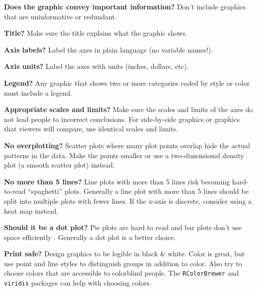 \documentclass{article}
\newcommand{\code}[1]{\texttt{#1}}
\begin{document}
\begin{checklist}
\item \textbf{Does the graphic convey important information?} Don't include
  graphics that are uninformative or redundant.
\item \textbf{Title?} Make sure the title explains what the graphic shows.
\item \textbf{Axis labels?} Label the axes in plain language (no variable
  names!).
\item \textbf{Axis units?} Label the axes with units (inches, dollars, etc).
\item \textbf{Legend?} Any graphic that shows two or more categories coded by
  style or color must include a legend.
\item \textbf{Appropriate scales and limits?} Make sure the scales and limits
  of the axes do not lead people to incorrect conclusions. For side-by-side
  graphics or graphics that viewers will compare, use identical scales and
  limits.
\item \textbf{No overplotting?} Scatter plots where many plot points overlap
  hide the actual patterns in the data. Make the points smaller or use a
  two-dimensional density plot (a smooth scatter plot) instead.
\item \textbf{No more than 5 lines?} Line plots with more than 5 lines risk
  becoming hard-to-read ``spaghetti'' plots. Generally a line plot with more
  than 5 lines should be split into multiple plots with fewer lines. If the
  x-axis is discrete, consider using a heat map instead.
\item \textbf{Should it be a dot plot?} Pie plots are hard to read and bar
  plots don't use space efficiently \autocite{cleveland90,heer10}. Generally a
  dot plot is a better choice.
\item \textbf{Print safe?} Design graphics to be legible in black \& white.
  Color is great, but use point and line styles to distinguish groups in
  addition to color. Also try to choose colors that are accessible to
  colorblind people. The \code{RColorBrewer} and \code{viridis} packages can
  help with choosing colors.
\end{checklist}
\end{document}
